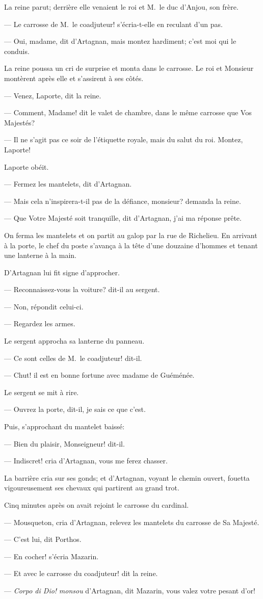 La reine parut; derrière elle venaient le roi et M.~le duc d'Anjou, son frère.

— Le carrosse de M.~le coadjuteur! s'écria-t-elle en reculant d'un pas.

— Oui, madame, dit d'Artagnan, mais montez hardiment; c'est moi qui le conduis.

La reine poussa un cri de surprise et monta dans le carrosse. Le roi et Monsieur montèrent après elle et s'assirent à ses côtés.

— Venez, Laporte, dit la reine.

— Comment, Madame! dit le valet de chambre, dans le même carrosse que Vos Majestés?

— Il ne s'agit pas ce soir de l'étiquette royale, mais du salut du roi. Montez, Laporte!

Laporte obéit.

— Fermez les mantelets, dit d'Artagnan.

— Mais cela n'inspirera-t-il pas de la défiance, monsieur? demanda la reine.

— Que Votre Majesté soit tranquille, dit d'Artagnan, j'ai ma réponse prête.

On ferma les mantelets et on partit au galop par la rue de Richelieu. En arrivant à la porte, le chef du poste s'avança à la tête d'une douzaine d'hommes et tenant une lanterne à la main.

D'Artagnan lui fit signe d'approcher.

— Reconnaissez-vous la voiture? dit-il au sergent.

— Non, répondit celui-ci.

— Regardez les armes.

Le sergent approcha sa lanterne du panneau.

— Ce sont celles de M.~le coadjuteur! dit-il.

— Chut! il est en bonne fortune avec madame de Guéménée.

Le sergent se mit à rire.

— Ouvrez la porte, dit-il, je sais ce que c'est.

Puis, s'approchant du mantelet baissé:

— Bien du plaisir, Monseigneur! dit-il.

— Indiscret! cria d'Artagnan, vous me ferez chasser.

La barrière cria sur ses gonds; et d'Artagnan, voyant le chemin ouvert, fouetta vigoureusement ses chevaux qui partirent au grand trot.

Cinq minutes après on avait rejoint le carrosse du cardinal.

— Mousqueton, cria d'Artagnan, relevez les mantelets du carrosse de Sa Majesté.

— C'est lui, dit Porthos.

— En cocher! s'écria Mazarin.

— Et avec le carrosse du coadjuteur! dit la reine.

— \textit{Corpo di Dio!} \textit{monsou} d'Artagnan, dit Mazarin, vous valez votre pesant d'or!